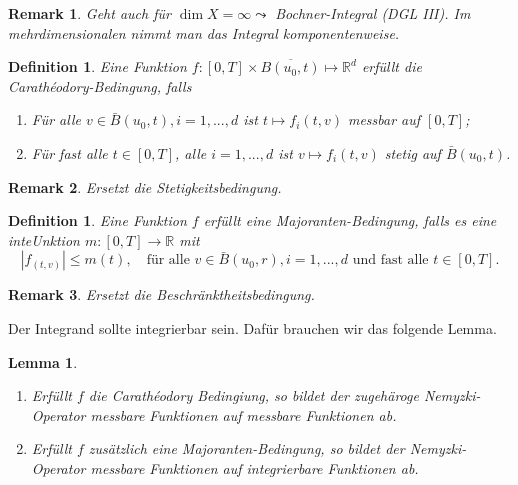 \documentclass[a4paper, 11pt]{article}
\newtheorem{lemma}[theorem]{Lemma}
\newtheorem{definition}[theorem]{Definition}
\newtheorem*{remark}{Remark}
\begin{document}
\begin{remark}
	Geht auch für $\dim X = \infty \leadsto $ Bochner-Integral (DGL III). Im mehrdimensionalen nimmt man das Integral komponentenweise.
\end{remark}

\begin{definition}
	Eine Funktion $f:[0,T] \times \overline{B(u_0,t)} \mapsto \mathbb R^d$ erfüllt die Carathéodory-Bedingung, falls 
	\begin{enumerate}[label=(\arabic*)]
		\item Für alle $v \in \bar B(u_0, t), i=1,...,d$ ist $t \mapsto f_i(t,v)$ messbar auf $[0,T]$;
		\item Für fast alle $t \in [0,T]$, alle $i=1,...,d$ ist $v \mapsto f_i(t,v)$ stetig auf $\bar B(u_0,t)$.
	\end{enumerate}
\end{definition}
\begin{remark}
	Ersetzt die Stetigkeitsbedingung.
\end{remark}

\begin{definition}
	Eine Funktion $f$ erfüllt eine Majoranten-Bedingung, falls es eine inteUnktion $m: [0,T] \to \mathbb R$ mit 
	\[
	|f_(t,v)| \leq m(t), \quad \text{für alle $v \in \bar B(u_0,r), i = 1,...,d$ und fast alle $t \in [0,T]$.}
	\]
\end{definition}
\begin{remark}
	Ersetzt die Beschränktheitsbedingung.
\end{remark}

Der Integrand sollte integrierbar sein. Dafür brauchen wir das folgende Lemma.

\begin{lemma}
	\begin{enumerate}
		\item Erfüllt $f$ die Carathéodory Bedingiung, so bildet der zugehäroge Nemyzki-Operator messbare Funktionen auf messbare Funktionen ab.
		
		\item Erfüllt $f$ zusätzlich eine Majoranten-Bedingung, so bildet der Nemyzki-Operator messbare Funktionen auf integrierbare Funktionen ab.
	\end{enumerate}
\end{lemma}
\end{document}
